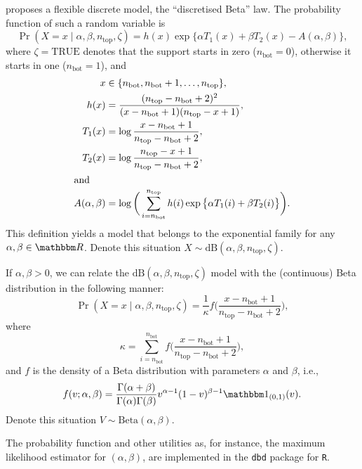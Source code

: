 \documentclass[12pt]{article}
\begin{document}
\citet{ANewVersatileDiscreteDistribution} proposes a flexible discrete model, the ``discretised Beta'' law.
The probability function of such a random variable is
\begin{equation}
\Pr(X  = x \mid \alpha, \beta, n_{\text{top}}, \zeta) = h(x) \exp\big\{ \alpha T_1(x) + \beta T_2(x) - A(\alpha, \beta) \big\},
\label{Eq:ProbdbExponential}
\end{equation}
where $\zeta=\text{TRUE}$ denotes that the support starts in zero ($n_{\text{bot}}=0$), otherwise it starts in one ($n_{\text{bot}}=1$), and
\begin{align}
x &\in \{n_{\text{bot}}, n_{\text{bot}}+1, \dots, n_{\text{top}}\},\\
h(x) & =\frac{(n_{\text{top}} - n_{\text{bot}}+2)^2}{
(x-n_{\text{bot}}+1)	(n_{\text{top}}-x+1)	},\\
T_1(x) &= \log\frac{x-n_{\text{bot}}+1}{n_{\text{top}}-n_{\text{bot}}+2}, \\
T_2(x) &= \log\frac{n_{\text{top}}-x+1}{n_{\text{top}}-n_{\text{bot}}+2}, \\
\intertext{and}
A(\alpha,\beta) &= \log \bigg(
\sum_{i=n_{\text{bot}}}^{n_{\text{top}}} h(i) \exp\big\{ \alpha T_1(i) + \beta T_2(i)\big\}
\bigg).
\end{align}
This definition yields a model that belongs to the exponential family for any $\alpha,\beta\in\mathbbm R$.
Denote this situation $X\sim\text{dB}(\alpha,\beta, n_{\text{top}},\zeta)$.

If $\alpha,\beta>0$, we can relate the $\text{dB}(\alpha,\beta, n_{\text{top}},\zeta)$ model with the (continuous) Beta distribution in the following manner:
\begin{equation}
\Pr(X=x \mid \alpha, \beta, n_{\text{top}}, \zeta) = 
\frac{1}{\kappa} f\Big(
\frac{x-n_{\text{bot}}+1}{n_{\text{top}}-n_{\text{bot}}+2}
\Big),
\label{Eq:Probdb}
\end{equation}
where
$$
\kappa = \sum_{i=n_{\text{bot}}}^{n_{\text{bot}}} f\Big(
\frac{x-n_{\text{bot}}+1}{n_{\text{top}}-n_{\text{bot}}+2}
\Big),
$$
and $f$ is the density of a Beta distribution with parameters $\alpha$ and $\beta$, i.e.,
\begin{equation}
	f(v;\alpha, \beta) = \frac{\Gamma(\alpha+\beta)}{\Gamma(\alpha)\Gamma(\beta)} v^{\alpha-1} (1-v)^{\beta-1} \mathbbm 1_{(0,1)}(v).
	\label{Eq:DensBeta}
\end{equation}
Denote this situation $V\sim\text{Beta}(\alpha,\beta)$.

The probability function and other utilities as, for instance, the maximum likelihood estimator for $(\alpha,\beta)$, are implemented in the \texttt{dbd} package for \texttt{R}.
\end{document}
